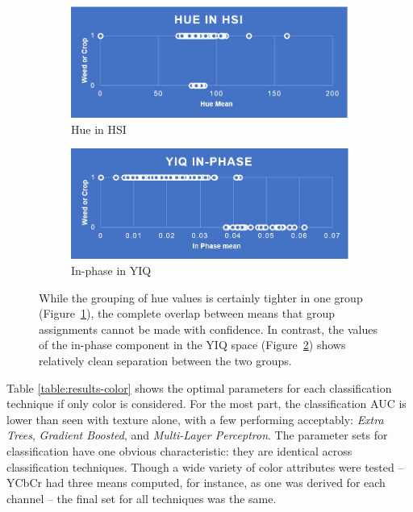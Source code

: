\documentclass[letterpaper]{report}
\begin{document}
\begin{figure}[H]
	\begin{subfigure}[h]{0.48\linewidth}
		\includegraphics[width=1\linewidth]{./figures/hsi-hue.jpg}
		\caption{Hue in HSI}
		\label{subfig:hue}	
	\end{subfigure}
	\hfill
	\begin{subfigure}[h]{0.48\linewidth}
		\includegraphics[width=1\linewidth]{./figures/yiq-in-phase.jpg}
		\caption{In-phase in YIQ}
		\label{subfig:in_phase}		
	\end{subfigure}%
	\caption[Prediction using hue in HSI and In-phase in YIQ]{While the grouping of hue values is certainly tighter in one group (Figure~\ref{subfig:hue}), the complete overlap between means that group assignments cannot be made with confidence. In contrast, the values of the in-phase component in the YIQ space (Figure~\ref{subfig:in_phase}) shows relatively clean separation between the two groups.}
	\label{fig:hue_vs_inphase}
\end{figure}

Table \ref{table:results-color} shows the optimal parameters for each classification technique if only color is considered. For the most part, the classification AUC is lower than seen with texture alone, with a few performing acceptably: \textit{Extra Trees}, \textit{Gradient Boosted}, and \textit{Multi-Layer Perceptron}.  The parameter sets for classification have one obvious characteristic: they are identical across classification techniques. Though a wide variety of color attributes were tested -- YCbCr had three means computed, for instance, as one was derived for each channel -- the final set for all techniques was the same.
\end{document}
